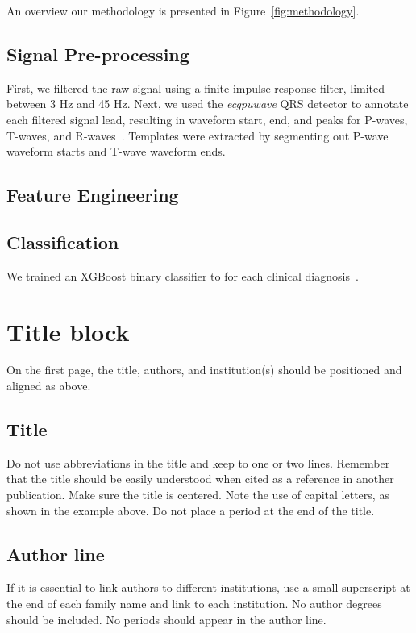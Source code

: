 \documentclass[twocolumn]{cinc}
\begin{document}
An overview our methodology is presented in Figure~\ref{fig:methodology}.

\subsection{Signal Pre-processing}

First, we filtered the raw signal using a finite impulse response filter, limited between 3 Hz and 45 Hz.
Next, we used the \emph{ecgpuwave} QRS detector to annotate each filtered signal lead, resulting in waveform start, end, and peaks for P-waves, T-waves, and R-waves~\cite{goldberger_ary_l_physiobank_2000}.
Templates were extracted by segmenting out P-wave waveform starts and T-wave waveform ends.

\subsection{Feature Engineering}

\subsection{Classification}

We trained an XGBoost binary classifier to for each clinical diagnosis~\cite{chen_xgboost_2016}.

\section{Title block}
 
On the first page, the title, authors, and institution(s) should be
positioned and aligned as above.

\subsection{Title} 
 
Do not use abbreviations in the title and keep to one or two
lines. Remember that the title should be easily understood when cited as a
reference in another publication. Make sure the title is centered. Note the
use of capital letters, as shown in the example above. Do not place a
period at the end of the title.

\subsection{ Author line}  
 
If it is essential to link authors to different institutions, use a small
superscript at the end of each family name and link to each institution. No author degrees should be
included. No periods should appear in the author line.
\end{document}
